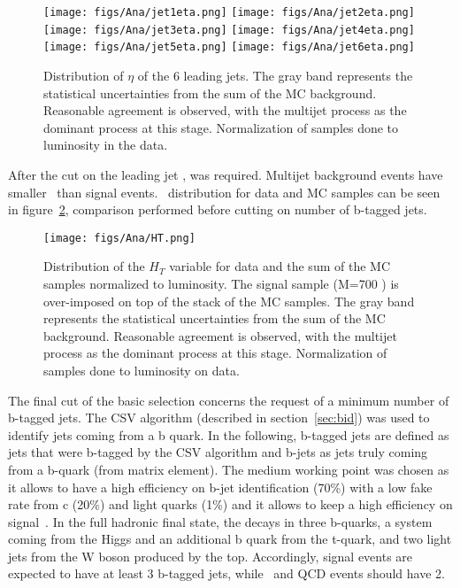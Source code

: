 \begin{figure}[!Hhtbp]
  \begin{center}
    \texttt{[image: figs/Ana/jet1eta.png]}
    \texttt{[image: figs/Ana/jet2eta.png]}
    \texttt{[image: figs/Ana/jet3eta.png]}
    \texttt{[image: figs/Ana/jet4eta.png]}
    \texttt{[image: figs/Ana/jet5eta.png]}
    \texttt{[image: figs/Ana/jet6eta.png]}
    \caption{Distribution of $\eta$ of the 6 leading jets. The gray band represents the statistical uncertainties from the sum of the MC background. Reasonable agreement is observed, with the multijet process as the dominant process at this stage. Normalization of samples done to luminosity in the data.}
    \label{fig:6jeta}
  \end{center}
\end{figure}

After the cut on the leading jet \pt,  was required. Multijet background events have smaller \HT~than signal events. \HT~distribution for data and MC samples can be seen in figure~\ref{fig:HT}, comparison performed before cutting on number of b-tagged jets.

\begin{figure}[!Hhtbp]
  \begin{center}
    \texttt{[image: figs/Ana/HT.png]}
    \caption{Distribution of the $H_{T}$ variable for data and the sum of the MC samples normalized to luminosity. The signal sample (M=700 \GeVcc) is over-imposed on top of the stack of the MC samples. The gray band represents the statistical uncertainties from the sum of the MC background. Reasonable agreement is observed, with the multijet process as the dominant process at this stage. Normalization of samples done to luminosity on data.}
    \label{fig:HT}
  \end{center}
\end{figure}

The final cut of the basic selection concerns the request of a minimum number of b-tagged jets. The CSV algorithm (described in section~\ref{sec:bid}) was used to identify jets coming from a b quark. In the following, b-tagged jets are defined as jets that were b-tagged by the CSV algorithm and b-jets as jets truly coming from a b-quark (from matrix element). The medium working point was chosen as it allows to have a high efficiency on b-jet identification (70\%) with a low fake rate from c (20\%) and light quarks (1\%) and it allows to keep a high efficiency on signal~\cite{Chatrchyan:2012jua, CMS:2013vea}. In the full hadronic final state, the \Tp decays in three b-quarks, a \bbbar system coming from the Higgs and an additional b quark from the t-quark, and two light jets from the W boson produced by the top. Accordingly, signal events are expected to have at least 3 b-tagged jets, while \ttbar~and QCD events should have 2.

